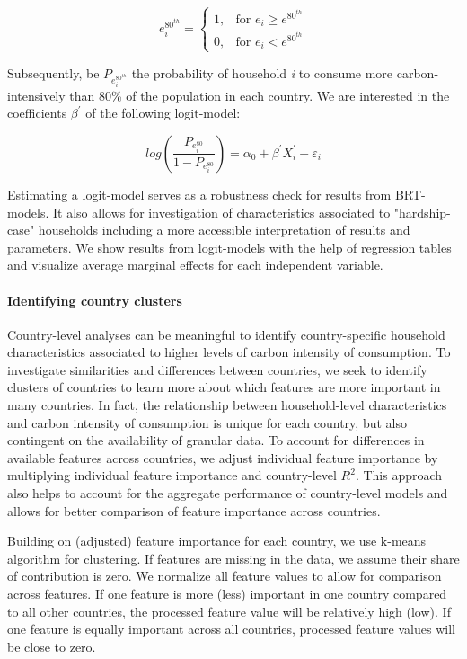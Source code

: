 \documentclass[12pt, a4paper]{article}
\begin{document}
\begin{equation}
    e_{i}^{80^{th}} =
    \begin{cases}
    1, & \text{for }  e_{i} \geq e^{80^{th}} \\
    0, & \text{for }  e_{i} < e^{80^{th}}
    \end{cases}
\end{equation}

Subsequently, be $P_{e_{i}^{80^{th}}}$ the probability of household \textit{i} to consume more carbon-intensively than 80\% of the population in each country. We are interested in the coefficients $\beta^{'}$ of the following logit-model:

\begin{equation}
    log \left( \frac{P_{e_{i}^{80}}}{1 - P_{e_{i}^{80}}} \right) = \alpha_{0} + \beta^{'} X_{i}^{'} + \varepsilon_{i}
\end{equation}

Estimating a logit-model serves as a robustness check for results from BRT-models. It also allows for investigation of characteristics associated to "hardship-case" households including a more accessible interpretation of results and parameters. We show results from logit-models with the help of regression tables and visualize average marginal effects for each independent variable.

\paragraph{Identifying country clusters} Country-level analyses can be meaningful to identify country-specific household characteristics associated to higher levels of carbon intensity of consumption. To investigate similarities and differences between countries, we seek to identify clusters of countries to learn more about which features are more important in many countries. In fact, the relationship between household-level characteristics and carbon intensity of consumption is unique for each country, but also contingent on the availability of granular data. To account for differences in available features across countries, we adjust individual feature importance by multiplying individual feature importance and country-level $R^{2}$. This approach also helps to account for the aggregate performance of country-level models and allows for better comparison of feature importance across countries.

Building on (adjusted) feature importance for each country, we use k-means algorithm for clustering. If features are missing in the data, we assume their share of contribution is zero. We normalize all feature values to allow for comparison across features. If one feature is more (less) important in one country compared to all other countries, the processed feature value will be relatively high (low). If one feature is equally important across all countries, processed feature values will be close to zero.
\end{document}
